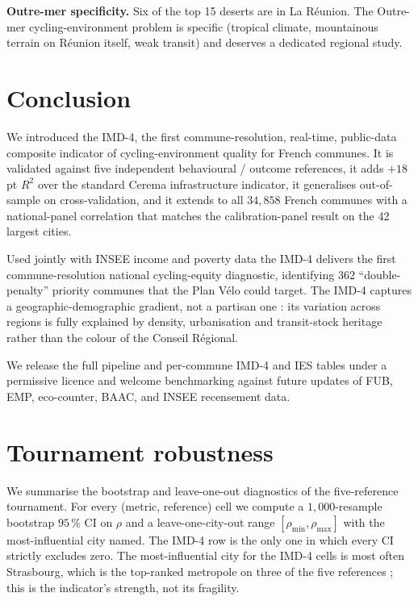 \documentclass[11pt,a4paper]{article}
\begin{document}
\textbf{Outre-mer specificity.}  Six of the top 15 deserts are in
La R\'eunion.  The Outre-mer cycling-environment problem is
specific (tropical climate, mountainous terrain on R\'eunion
itself, weak transit) and deserves a dedicated regional study.

\section{Conclusion}
\label{sec:conclusion}

We introduced the IMD-4, the first commune-resolution, real-time,
public-data composite indicator of cycling-environment quality
for French communes.  It is validated against five independent
behavioural / outcome references, it adds $+18\,$pt $R^2$ over
the standard Cerema infrastructure indicator, it generalises
out-of-sample on cross-validation, and it extends to all
$34{,}858$ French communes with a national-panel correlation
that matches the calibration-panel result on the 42 largest
cities.

Used jointly with INSEE income and poverty data the IMD-4
delivers the first commune-resolution national cycling-equity
diagnostic, identifying $362$ ``double-penalty'' priority communes
that the Plan V\'elo could target.  The IMD-4 captures a
geographic-demographic gradient, not a partisan one : its variation
across regions is fully explained by density, urbanisation and
transit-stock heritage rather than the colour of the Conseil
R\'egional.

We release the full pipeline and per-commune IMD-4 and IES
tables under a permissive licence and welcome benchmarking against
future updates of FUB, EMP, eco-counter, BAAC, and INSEE recensement
data.

\appendix

\section{Tournament robustness}
\label{app:robust}

We summarise the bootstrap and leave-one-out diagnostics of the
five-reference tournament.  For every (metric, reference) cell we
compute a $1{,}000$-resample bootstrap $95\,\%$ CI on $\rho$ and a
leave-one-city-out range $[\rho_{\min}, \rho_{\max}]$ with the
most-influential city named.  The IMD-4 row is the only one in
which every CI strictly excludes zero.  The most-influential
city for the IMD-4 cells is most often Strasbourg, which is the
top-ranked metropole on three of the five references ; this is
the indicator's strength, not its fragility.


\end{document}
